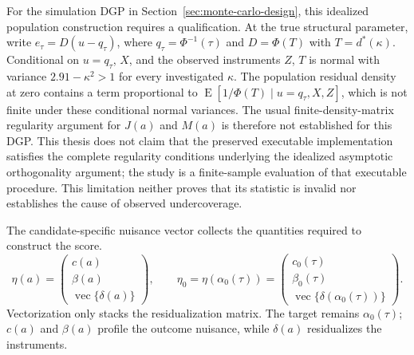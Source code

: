 For the simulation DGP in Section~\ref{sec:monte-carlo-design}, this idealized population construction requires a qualification. At the true structural parameter, write $e_\tau=D(u-q_\tau)$, where $q_\tau=\Phi^{-1}(\tau)$ and $D=\Phi(T)$ with $T=d^*(\kappa)$. Conditional on $u=q_\tau$, $X$, and the observed instruments $Z$, $T$ is normal with variance $2.91-\kappa^2>1$ for every investigated $\kappa$. The population residual density at zero contains a term proportional to $\operatorname{E}[1/\Phi(T)\mid u=q_\tau,X,Z]$, which is not finite under these conditional normal variances. The usual finite-density-matrix regularity argument for $J(a)$ and $M(a)$ is therefore not established for this DGP. This thesis does not claim that the preserved executable implementation satisfies the complete regularity conditions underlying the idealized asymptotic orthogonality argument; the study is a finite-sample evaluation of that executable procedure. This limitation neither proves that its statistic is invalid nor establishes the cause of observed undercoverage.

The candidate-specific nuisance vector collects the quantities required to construct the score.
\begin{equation}
    \eta(a)
    =
    \begin{pmatrix}
        c(a)\\
        \beta(a)\\
        \operatorname{vec}\{\delta(a)\}
    \end{pmatrix},
    \qquad
    \eta_0
    =
    \eta\!\left(\alpha_0(\tau)\right)
    =
    \begin{pmatrix}
        c_0(\tau)\\
        \beta_0(\tau)\\
        \operatorname{vec}\{\delta(\alpha_0(\tau))\}
    \end{pmatrix}.
    \label{eq:profile-eta}
\end{equation}
Vectorization only stacks the residualization matrix. The target remains $\alpha_0(\tau)$; $c(a)$ and $\beta(a)$ profile the outcome nuisance, while $\delta(a)$ residualizes the instruments.

